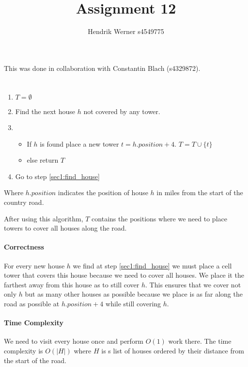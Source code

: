 \documentclass[12pt, a4paper]{article}
\title{Assignment 12}
\author{Hendrik Werner s4549775}
\begin{document}
\maketitle

This was done in collaboration with Constantin Blach (s4329872).

\section{} %

\begin{enumerate}
	\item $T = \emptyset$
	\item Find the next house $h$ not covered by any tower. \label{sec1:find_house}
	\item \begin{itemize}
		\item If $h$ is found place a new tower $t = h.position + 4$. $T = T \cup \{t\}$
		\item else return $T$
	\end{itemize}
	\item Go to step \ref{sec1:find_house}
\end{enumerate}

Where $h.position$ indicates the position of house $h$ in miles from the start of the country road.

After using this algorithm, $T$ contains the positions where we need to place towers to cover all houses along the road.

\paragraph{Correctness}
For every new house $h$ we find at step \ref{sec1:find_house} we must place a cell tower that covers this house because we need to cover all houses. We place it the farthest away from this house as to still cover $h$. This ensures that we cover not only $h$ but as many other houses as possible because we place is as far along the road as possible at $h.position + 4$ while still covering $h$.

\paragraph{Time Complexity}
We need to visit every house once and perform $O(1)$ work there. The time complexity is $O(|H|)$ where $H$ is s list of houses ordered by their distance from the start of the road.
\end{document}
